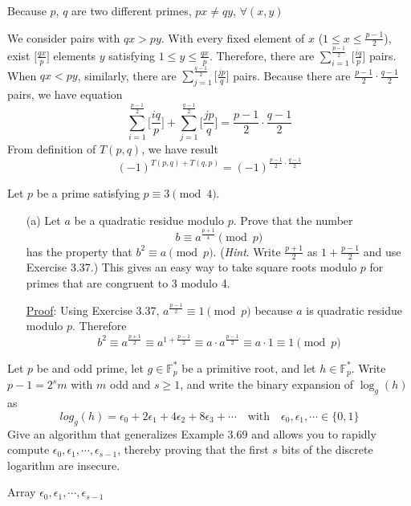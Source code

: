 \begin{exer}[3.38]
\begin{enumerate}
		Because $p$, $q$ are two different primes, $px \neq qy$, $\forall (x, y)$
		
		We consider pairs with $qx > py$. With every fixed element of $x$ ($1 \leq x \leq \frac{p-1}{2}$), exist $\Big[\frac{qx}{p}\Big]$ elements $y$ satisfying $1 \leq y \leq \frac{qx}{p}$. Therefore, there are $\sum_{i=1}^{\frac{p-1}{2}}\Big[\frac{iq}{p}\Big]$ pairs. When $qx < py$, similarly, there are $\sum_{j=1}^{\frac{q-1}{2}}\Big[\frac{jp}{q}\Big]$ pairs. Because there are $\frac{p-1}{2} \cdot \frac{q-1}{2}$ pairs, we have equation $$\sum_{i=1}^{\frac{p-1}{2}}\Big[\frac{iq}{p}\Big] + \sum_{j=1}^{\frac{q-1}{2}}\Big[\frac{jp}{q}\Big] = \frac{p-1}{2} \cdot \frac{q-1}{2}$$
		From definition of $T(p, q)$, we have result $$(-1)^{T(p, q) + T(q, p)} = (-1)^{\frac{p-1}{2} \cdot \frac{q-1}{2}}$$
	\end{enumerate}
\end{exer}

\begin{exer}[3.39] Let $p$ be a prime satisfying $p \equiv 3 \pmod 4$.
	\begin{enumerate}
		\item [(a)] Let $a$ be a quadratic residue modulo $p$. Prove that the number $$b \equiv a^{\frac{p+1}{4}} \pmod p$$ has the property that $b^2 \equiv a \pmod p$. (\textit{Hint}. Write $\frac{p+1}{2}$ as $1+\frac{p-1}{2}$ and use Exercise 3.37.) This gives an easy way to take square roots modulo $p$ for primes that are congruent to 3 modulo 4.
		
		\underline{Proof}: Using Exercise 3.37, $a^{\frac{p-1}{2}} \equiv 1 \pmod p$ because $a$ is quadratic residue modulo $p$. Therefore $$b^2 \equiv a^{\frac{p+1}{2}} \equiv a^{1+\frac{p-1}{2}} \equiv a \cdot a^{\frac{p-1}{2}} \equiv a \cdot 1 \equiv 1 \pmod p$$
	\end{enumerate}
\end{exer}

\begin{exer}[3.40] Let $p$ be and odd prime, let $g \in \mathbb{F}^{*}_p$ be a primitive root, and let $h \in \mathbb{F}^{*}_p$. Write $p - 1 = 2^sm$ with $m$ odd and $s \geq 1$, and write the binary expansion of $\log_g(h)$ as $$log_g(h) = \epsilon_0 + 2\epsilon_1 + 4\epsilon_2 + 8\epsilon_3 + \cdots \quad \text{with} \quad \epsilon_0, \epsilon_1, \cdots \in \{0, 1\}$$
	Give an algorithm that generalizes Example 3.69 and allows you to rapidly compute $\epsilon_0, \epsilon_1, \cdots, \epsilon_{s-1}$, thereby proving that the first $s$ bits of the discrete logarithm are insecure.
	
	\begin{algorithm*}[H]
		\SetAlgoLined
		Array $\epsilon_0, \epsilon_1, \cdots, \epsilon_{s-1}$\;
	\end{algorithm*}
\end{exer}

